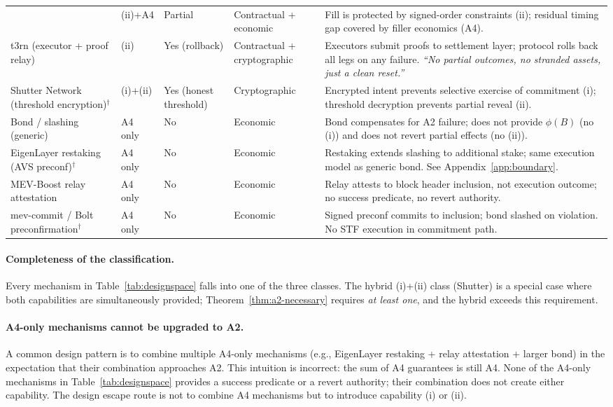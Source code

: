 \begin{table}[t]
\begin{tabular}{@{}llllp{5.2cm}@{}}
  & (ii)+A4 & Partial
  & Contractual + economic
  & Fill is protected by signed-order constraints (ii); residual
    timing gap covered by filler economics (A4). \\
t3rn (executor + proof relay)
  & (ii) & Yes (rollback)
  & Contractual + cryptographic
  & Executors submit proofs to settlement layer; protocol rolls back
    all legs on any failure. \emph{``No partial outcomes, no stranded
    assets, just a clean reset.''}~\cite{t3rn-docs} \\
\midrule
Shutter Network (threshold encryption)$^\dagger$
  & (i)+(ii) & Yes (honest threshold)
  & Cryptographic
  & Encrypted intent prevents selective exercise of commitment (i);
    threshold decryption prevents partial reveal (ii). \\
\midrule
Bond / slashing (generic)
  & A4 only & No & Economic
  & Bond compensates for A2 failure; does not provide $\phi(B)$
    (no (i)) and does not revert partial effects (no (ii)). \\
EigenLayer restaking (AVS preconf)$^\dagger$
  & A4 only & No & Economic
  & Restaking extends slashing to additional stake; same execution
    model as generic bond. See Appendix~\ref{app:boundary}. \\
MEV-Boost relay attestation
  & A4 only & No & Economic
  & Relay attests to block header inclusion, not execution outcome;
    no success predicate, no revert authority. \\
mev-commit / Bolt preconfirmation$^\dagger$
  & A4 only & No & Economic
  & Signed preconf commits to inclusion; bond slashed on
    violation. No STF execution in commitment path. \\
\bottomrule
\end{tabular}
\end{table}

\paragraph{Completeness of the classification.}
Every mechanism in Table~\ref{tab:designspace} falls into one of the three
classes. The hybrid (i)+(ii) class (Shutter) is a special case where both
capabilities are simultaneously provided; Theorem~\ref{thm:a2-necessary}
requires \emph{at least one}, and the hybrid exceeds this requirement.

\paragraph{A4-only mechanisms cannot be upgraded to A2.}
A common design pattern is to combine multiple A4-only mechanisms (e.g.,
EigenLayer restaking + relay attestation + larger bond) in the expectation
that their combination approaches A2. This intuition is incorrect: the sum
of A4 guarantees is still A4. None of the A4-only mechanisms in
Table~\ref{tab:designspace} provides a success predicate or a revert
authority; their combination does not create either capability. The design
escape route is not to combine A4 mechanisms but to introduce capability (i)
or (ii).

